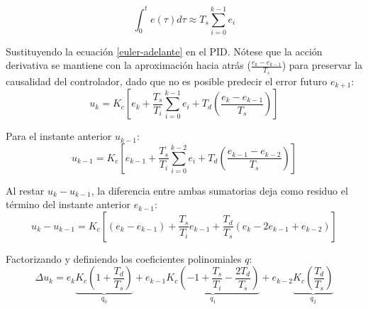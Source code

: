 \begin{equation}
  \int_{0}^{t} e(\tau) d\tau \approx T_s\sum_{i=0}^{k-1} e_i
  \label{euler-adelante}
\end{equation}

Sustituyendo la ecuación \ref{euler-adelante} en el PID. Nótese que la acción derivativa se mantiene con la aproximación hacia atrás ($\frac{e_k - e_{k-1}}{T_s}$) para preservar la causalidad del controlador, dado que no es posible predecir el error futuro $e_{k+1}$:
\[
  u_k = K_c \left[ e_k + \frac{T_s}{T_i}\sum_{i=0}^{k-1}e_i + T_d\left(\frac{e_k - e_{k-1}}{T_s}\right) \right]
\]

Para el instante anterior $u_{k-1}$:
\[
  u_{k-1} = K_c \left[ e_{k-1} + \frac{T_s}{T_i}\sum_{i=0}^{k-2}e_i + T_d\left(\frac{e_{k-1} - e_{k-2}}{T_s}\right) \right]
\]

Al restar $u_k - u_{k-1}$, la diferencia entre ambas sumatorias deja como residuo el término del instante anterior $e_{k-1}$:
\[
  u_k - u_{k-1} = K_c \left[ (e_k - e_{k-1}) + \frac{T_s}{T_i}e_{k-1} + \frac{T_d}{T_s}(e_k - 2e_{k-1} + e_{k-2}) \right]
\]

Factorizando y definiendo los coeficientes polinomiales $q$:
\begin{equation}
  \Delta u_k = e_k\underbrace{K_c\left(1 + \frac{T_d}{T_s}\right)}_{q_0} + e_{k-1}\underbrace{K_c\left(-1 + \frac{T_s}{T_i} - \frac{2T_d}{T_s}\right)}_{q_1} + e_{k-2}\underbrace{K_c\left(\frac{T_d}{T_s}\right)}_{q_2}
  \label{PID-euler-adelante-final}
\end{equation}
